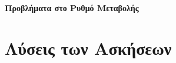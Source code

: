 


\pagestyle{askhseis}





\begin{center}
\large{\bfseries \textcolor{Col1}{Προβλήματα στο Ρυθμό Μεταβολής}}
\end{center}

\vspace{\baselineskip}

\section*{Λύσεις των Ασκήσεων}


